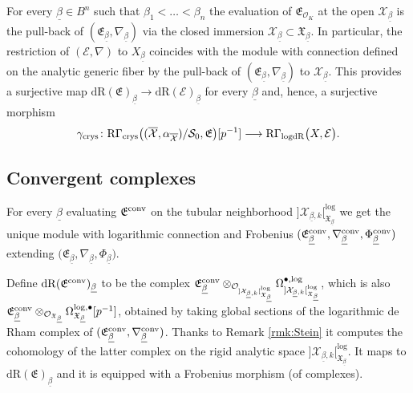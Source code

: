 \documentclass[asterisque,english]{smfart}
\begin{document}
For every $\underline{\beta}\in B^n$ such that $\beta_1<\ldots < \beta_n$ the evaluation of $\mathfrak{E}_{\mathcal{O}_K}$ at the open $\mathcal{X}_{\underline{\beta}}$ is the pull-back of   $(\mathfrak{E}_{\underline {\beta}}, \nabla_{\underline{\beta}})$ via the closed immersion $\mathcal{X}_{\underline{\beta}}\subset  \mathfrak{X}_{\underline{\beta}}$. In particular, the restriction of $(\mathcal{E},\nabla)$ to $X_{\underline{\beta}}$ coincides with the module with connection  defined on the analytic generic fiber  by the pull-back of  $(\mathfrak{E}_{\underline {\beta}}, \nabla_{\underline{\beta}})$  to $\mathcal{X}_{\underline{\beta}}$.  This provides a surjective map $\mathrm{dR}(\mathfrak{E})_{\underline{\beta}}\to \mathrm{dR}(\mathcal{E})_{\underline{\beta}}$ for every $\underline{\beta}$ and, hence, a surjective morphism $$\gamma_{\rm crys}\colon \mathrm{R}\Gamma_{\mathrm{crys}}\bigl((\overline{\mathcal{X}},\alpha_{\overline{\mathcal{X}}})/\mathcal{S}_0,\mathfrak{E}\bigr) [p^{-1}] \longrightarrow \mathrm{R}\Gamma_{\mathrm{logdR}}\bigl(X, \mathcal{E}\bigr).$$









\subsection{Convergent complexes}\label{sec:analsyn}


For every $\underline{\beta}$ evaluating $\mathfrak{E}^{\rm conv}$ on the tubular neighborhood  $]\mathcal{X}_{\underline{\beta},k}   [_{\mathfrak{X}_{\underline{\beta}}}^{\log}$ we get the unique module with logarithmic connection and Frobenius $(\mathfrak{E}^{\rm conv}_{\underline{\beta}},\nabla_{\underline{\beta}}^{\rm conv}, \Phi_{\underline{\beta}}^{\rm conv})$ extending $\bigl(\mathfrak{E}_{\underline {\beta}}, \nabla_{\underline{\beta}}, \Phi_{\underline{\beta}}\bigr)$.




Define $\mathrm{dR}(\mathfrak{E}^{\rm conv})_{\underline{\beta}}$ to be the complex $\mathfrak{E}^{\rm conv}_{\underline{\beta}} \otimes_{\mathcal{O}_{]\mathcal{X}_{\underline{\beta},k}   [_{\mathfrak{X}_{\underline{\beta}}}^{\log}} }   \Omega^{\bullet,\log}_{]\mathcal{X}_{\underline{\beta},k}   [_{\mathfrak{X}_{\underline{\beta}}}^{\log}}$, which is also $\mathfrak{E}^{\rm conv}_{\underline{\beta}}  \otimes_{\mathcal{O}_{\mathfrak{X}_{\underline{\beta}}}}  \Omega_{\mathfrak{X}_{\underline{\beta}}}^{\log,\bullet}[p^{-1}] $,  obtained by taking global sections of the logarithmic de Rham  complex of $(\mathfrak{E}^{\rm conv}_{\underline{\beta}},\nabla_{\underline{\beta}}^{\rm conv})$. Thanks to Remark \ref{rmk:Stein} it computes the cohomology of the latter complex on the rigid analytic space $]\mathcal{X}_{\underline{\beta},k}   [_{\mathfrak{X}_{\underline{\beta}}}^{\log} $.  It maps to $\mathrm{dR}(\mathfrak{E})_{\underline{\beta}}$ and it is equipped with a Frobenius morphism (of complexes). 
\end{document}
